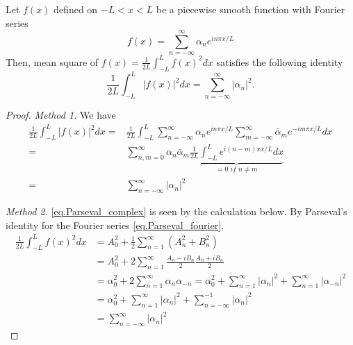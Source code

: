 \begin{theorem}
    Let $f(x)$ defined on $-L<x<L$ be a piecewise smooth function with Fourier series 
    \begin{equation}\label{eq.Parseval_complex_assumption}
        f(x)=\sum_{n=-\infty}^{\infty} \alpha_n e^{i n \pi x / L}
    \end{equation}
    Then, mean square of $f(x)=\frac{1}{2 L} \int_{-L}^L f(x)^2 d x$ satisfies the following identity
    \begin{equation}\label{eq.Parseval_complex}
        \frac{1}{2 L} \int_{-L}^L |f(x)|^2 d x=\sum_{n=-\infty}^{\infty}\left|\alpha_n\right|^2 .
    \end{equation}
\end{theorem}
\begin{proof}
\textit{Method 1.} We have 
\begin{equation}\label{eq.proof_Parseval_complex_1}
    \begin{split}
        \frac{1}{2 L} \int_{-L}^L |f(x)|^2 d x 
        =& \frac{1}{2 L} \int_{-L}^L \sum_{n=-\infty}^{\infty} \alpha_n e^{i n \pi x / L} \sum_{m=-\infty}^{\infty} \bar{\alpha}_m e^{-i m \pi x / L} dx
        \\
        =& \sum_{n,m=0}^{\infty}\alpha_n\bar{\alpha}_m \underbrace{\frac{1}{2 L} \int_{-L}^L e^{i (n-m) \pi x / L} d x}_{= 0\textit{ if }n\neq m}
        \\
        =&\sum_{n=-\infty}^{\infty}\left|\alpha_n\right|^2
    \end{split}
\end{equation}
    

\textit{Method 2.} \eqref{eq.Parseval_complex} is seen by the calculation below. By Parseval's identity for the Fourier series \eqref{eq.Parseval_fourier},
$$
\begin{aligned}
\frac{1}{2 L} \int_{-L}^L f(x)^2 d x & =A_0^2+\frac{1}{2} \sum_{n=1}^{\infty}\left(A_n^2+B_n^2\right) \\
& =A_0^2+2 \sum_{n=1}^{\infty} \frac{A_n-i B_n}{2} \frac{A_n+i B_n}{2} \\
& =\alpha_0^2+2 \sum_{n=1}^{\infty} \alpha_n \alpha_{-n}=\alpha_0^2+\sum_{n=1}^{\infty}\left|\alpha_n\right|^2+\sum_{n=1}^{\infty}\left|\alpha_{-n}\right|^2 \\
& =\alpha_0^2+\sum_{n=1}^{\infty}\left|\alpha_n\right|^2+\sum_{n=-\infty}^{-1}\left|\alpha_n\right|^2 \\
& =\sum_{n=-\infty}^{\infty}\left|\alpha_n\right|^2
\end{aligned}
$$

\end{proof}

